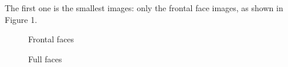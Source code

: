 \documentclass[11pt]{article}
\begin{document}
The first one is the smallest images: only the frontal face images, as shown in Figure 1. \\
\begin{figure}[H]
\centering
{}
\caption{Frontal faces}
\label{Fig.lable}
\end{figure}

\begin{figure}[H]
\centering
{}
\caption{Full faces}
\label{Fig.lable}
\end{figure}
\end{document}
